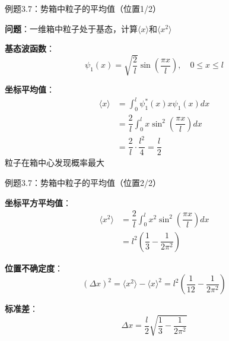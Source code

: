 \documentclass[aspectratio=169, 10pt]{beamer}
\begin{document}
\begin{frame}{例题3.7：势箱中粒子的平均值（位置1/2）}

  \textbf{问题}：一维箱中粒子处于基态，计算$\langle x \rangle$和$\langle x^2 \rangle$

  \begin{iqbitemize}
    \item \textbf{基态波函数}：
    \[
      \psi_1(x) = \sqrt{\dfrac{2}{l}}\sin\left(\dfrac{\pi x}{l}\right), \quad 0 \leq x \leq l
    \]

    \item \textbf{坐标平均值}：
    \begin{align*}
      \langle x \rangle &= \int_0^l \psi_1^*(x)x\psi_1(x)dx \\
      &= \dfrac{2}{l}\int_0^l x\sin^2\left(\dfrac{\pi x}{l}\right)dx \\
      &= \dfrac{2}{l} \cdot \dfrac{l^2}{4} = \dfrac{l}{2}
    \end{align*}
    粒子在箱中心发现概率最大
  \end{iqbitemize}

\end{frame}

\begin{frame}{例题3.7：势箱中粒子的平均值（位置2/2）}

  \begin{iqbitemize}
    \item \textbf{坐标平方平均值}：
    \begin{align*}
      \langle x^2 \rangle &= \dfrac{2}{l}\int_0^l x^2\sin^2\left(\dfrac{\pi x}{l}\right)dx \\
      &= l^2\left(\dfrac{1}{3} - \dfrac{1}{2\pi^2}\right)
    \end{align*}

    \item \textbf{位置不确定度}：
    \[
      (\Delta x)^2 = \langle x^2 \rangle - \langle x \rangle^2 = l^2\left(\dfrac{1}{12} - \dfrac{1}{2\pi^2}\right)
    \]

    \item \textbf{标准差}：
    \[
      \Delta x = \dfrac{l}{2}\sqrt{\dfrac{1}{3} - \dfrac{1}{2\pi^2}}
    \]
  \end{iqbitemize}

\end{frame}
\end{document}
